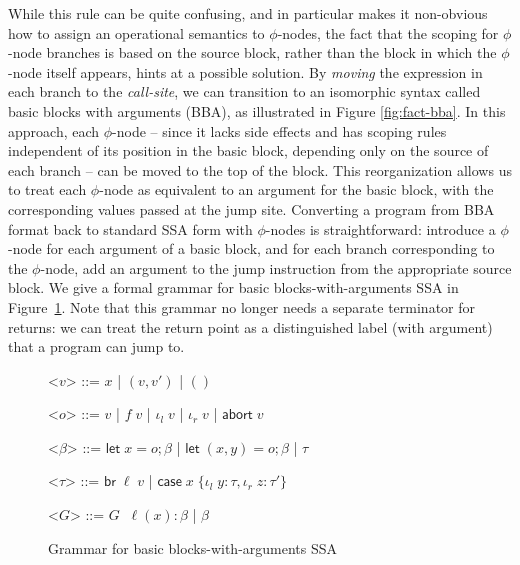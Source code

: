 \documentclass[acmsmall,screen,review]{acmart}
\newcommand{\ms}[1]{\ensuremath{\mathsf{#1}}}
\newcommand{\lto}{:}
\newcommand{\linl}[1]{\iota_l\;{#1}}
\newcommand{\linr}[1]{\iota_r\;{#1}}
\newcommand{\labort}[1]{\ms{abort}\;{#1}}
\newcommand{\letstmt}[3]{\ensuremath{\ms{let}\;#1 = #2; #3}}
\newcommand{\brb}[2]{\ms{br}\;#1\;#2}
\newcommand{\casestmt}[5]{\ms{case}\;#1\;\{\linl{#2} \lto #3, \linr{#4} \lto #5\}}
\begin{document}
While this rule can be quite confusing, and in particular makes it non-obvious how to assign an
operational semantics to $\phi$-nodes, the fact that the scoping for $\phi$-node branches is based
on the source block, rather than the block in which the $\phi$-node itself appears, hints at a
possible solution. By \emph{moving} the expression in each branch to the \emph{call-site}, we can
transition to an isomorphic syntax called basic blocks with arguments (BBA), as illustrated in
Figure \ref{fig:fact-bba}. In this approach, each $\phi$-node -- since it lacks side effects and has
scoping rules independent of its position in the basic block, depending only on the source of each
branch -- can be moved to the top of the block. This reorganization allows us to treat each
$\phi$-node as equivalent to an argument for the basic block, with the corresponding values passed
at the jump site. Converting a program from BBA format back to standard SSA form with $\phi$-nodes
is straightforward: introduce a $\phi$-node for each argument of a basic block, and for each branch
corresponding to the $\phi$-node, add an argument to the jump instruction from the appropriate
source block. We give a formal grammar for basic blocks-with-arguments SSA in
Figure~\ref{fig:bba-grammar}. Note that this grammar no longer needs a separate terminator for
returns: we can treat the return point as a distinguished label (with argument) that a program can
jump to. 

\begin{figure}[H]
  \begin{center}
    \begin{grammar}
      <\(v\)> ::= \(x\) \;|\; \((v, v')\) \;|\; \(()\)

      <\(o\)> ::= \(v\) \;|\; \(f\;v\) \;|\; \(\linl{v}\) \;|\; \(\linr{v}\) \;|\; \(\labort{v}\)

      <\(\beta\)> ::= 
      \(\letstmt{x}{o}{\beta}\)
      \;|\; \(\letstmt{(x, y)}{o}{\beta}\)
      \;|\; \(\tau\)

      <\(\tau\)> ::= \(\brb{\ell}{v}\) \;|\; $\casestmt{x}{y}{\tau}{z}{\tau'}$
      
      <\(G\)> ::= \(G \;\; \ell(x) : \beta\) \;|\; \(\beta\)
    \end{grammar}
  \end{center}
  \caption{Grammar for basic blocks-with-arguments SSA} 
  \Description{}
  \label{fig:bba-grammar}
\end{figure}
\end{document}

